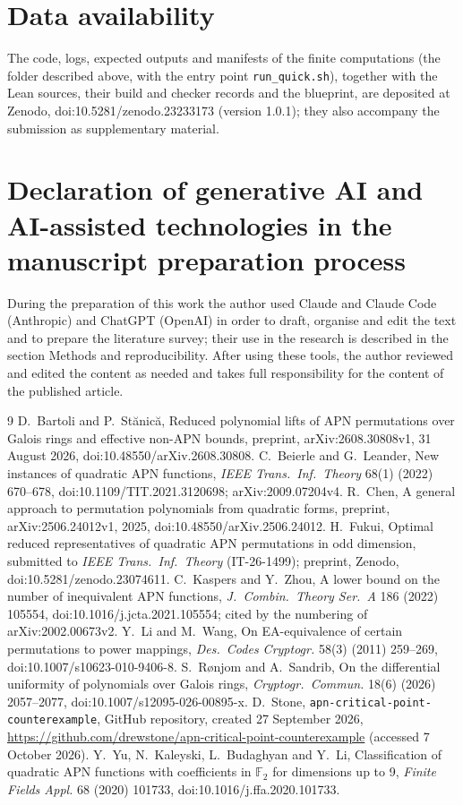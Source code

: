 \documentclass[preprint,12pt]{elsarticle}
\theoremstyle{definition}
\newcommand{\F}{\mathbb{F}}
\begin{document}
\section*{Data availability}
The code, logs, expected outputs and manifests of the finite computations (the folder described above, with the entry point \texttt{run\_quick.sh}), together with the Lean sources, their build and checker records and the blueprint, are deposited at Zenodo, doi:10.5281/zenodo.23233173 (version 1.0.1); they also accompany the submission as supplementary material.

\section*{Declaration of generative AI and AI-assisted technologies in the manuscript preparation process}
During the preparation of this work the author used Claude and Claude Code (Anthropic) and ChatGPT (OpenAI) in order to draft, organise and edit the text and to prepare the literature survey; their use in the research is described in the section Methods and reproducibility. After using these tools, the author reviewed and edited the content as needed and takes full responsibility for the content of the published article.

\begin{thebibliography}{9}
 D.~Bartoli and P.~St\u{a}nic\u{a}, Reduced polynomial lifts of APN permutations over Galois rings and effective non-APN bounds, preprint, arXiv:2608.30808v1, 31 August 2026, doi:10.48550/arXiv.2608.30808.
 C.~Beierle and G.~Leander, New instances of quadratic APN functions, \emph{IEEE Trans.\ Inf.\ Theory} 68(1) (2022) 670--678, doi:10.1109/TIT.2021.3120698; arXiv:2009.07204v4.
 R.~Chen, A general approach to permutation polynomials from quadratic forms, preprint, arXiv:2506.24012v1, 2025, doi:10.48550/arXiv.2506.24012.
 H.~Fukui, Optimal reduced representatives of quadratic APN permutations in odd dimension, submitted to \emph{IEEE Trans.\ Inf.\ Theory} (IT-26-1499); preprint, Zenodo, doi:10.5281/zenodo.23074611.
 C.~Kaspers and Y.~Zhou, A lower bound on the number of inequivalent APN functions, \emph{J.\ Combin.\ Theory Ser.~A} 186 (2022) 105554, doi:10.1016/j.jcta.2021.105554; cited by the numbering of arXiv:2002.00673v2.
 Y.~Li and M.~Wang, On EA-equivalence of certain permutations to power mappings, \emph{Des.\ Codes Cryptogr.} 58(3) (2011) 259--269, doi:10.1007/s10623-010-9406-8.
 S.~R{\o}njom and A.~Sandrib, On the differential uniformity of polynomials over Galois rings, \emph{Cryptogr.\ Commun.} 18(6) (2026) 2057--2077, doi:10.1007/s12095-026-00895-x.
 D.~Stone, \texttt{apn-critical-point-counterexample}, GitHub repository, created 27 September 2026, \url{https://github.com/drewstone/apn-critical-point-counterexample} (accessed 7 October 2026).
 Y.~Yu, N.~Kaleyski, L.~Budaghyan and Y.~Li, Classification of quadratic APN functions with coefficients in $\F_2$ for dimensions up to 9, \emph{Finite Fields Appl.} 68 (2020) 101733, doi:10.1016/j.ffa.2020.101733.
\end{thebibliography}
\end{document}
